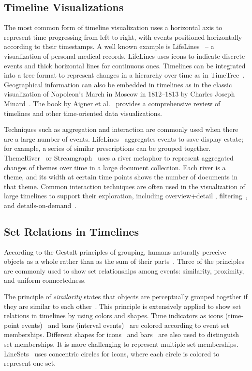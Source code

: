 \subsection{Timeline Visualizations}
The most common form of timeline visualization uses a horizontal axis to represent time progressing from left to right, with events positioned horizontally according to their timestamps. A well known example is LifeLines~\cite{Plaisant1998} -- a visualization of personal medical records. LifeLines uses icons to indicate discrete events and thick horizontal lines for continuous ones. Timelines can be integrated into a tree format to represent changes in a hierarchy over time as in TimeTree~\cite{Card2006}. Geographical information can also be embedded in timelines as in the classic visualization of Napoleon's March in Moscow in 1812--1813 by Charles Joseph Minard~\cite{Minard1869}. The book by Aigner et al.~\cite{Aigner2011} provides a comprehensive review of timelines and other time-oriented data visualizations.

Techniques such as aggregation and interaction are commonly used when there are a large number of events. LifeLines~\cite{Plaisant1998} aggregates events to save display estate; for example, a series of similar prescriptions can be grouped together. ThemeRiver~\cite{Havre2002} or Streamgraph~\cite{Byron2008} uses a river metaphor to represent aggregated changes of themes over time in a large document collection. Each river is a theme, and its width at certain time points shows the number of documents in that theme. Common interaction techniques are often used in the visualization of large timelines to support their exploration, including overview+detail \cite{Andre2007},  filtering~\cite{Plaisant1996a}, and details-on-demand~\cite{Stab2010}.

\subsection{Set Relations in Timelines}
According to the Gestalt principles of grouping, humans naturally perceive objects as a whole rather than as the sum of their parts~\cite{Koffka1935}. Three of the principles are commonly used to show set relationships among events: similarity, proximity, and uniform connectedness.

The principle of \textit{similarity} states that objects are perceptually grouped together if they are similar to each other~\cite{Koffka1935}. This principle is extensively applied to show set relations in timelines by using colors and shapes. Time indicators as icons (time-point events)~\cite{SimileTimeline2009} and bars (interval events)~\cite{Wang2008} are colored according to event set memberships. Different shapes for icons~\cite{TimeGlider2012} and bars~\cite{Plaisant1998} are also used to distinguish set memberships. It is more challenging to represent multiple set memberships. LineSets~\cite{Alper2011} uses concentric circles for icons, where each circle is colored to represent one set.


